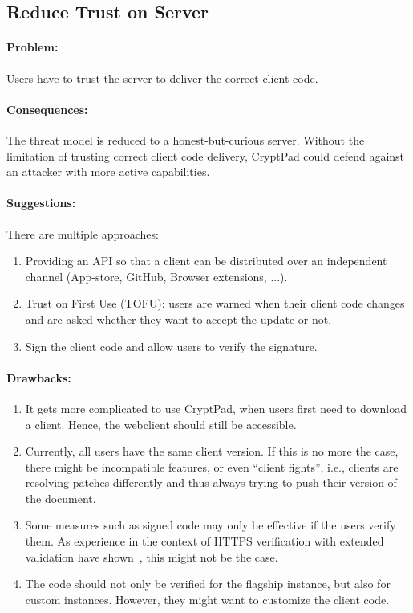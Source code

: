 \subsection{Reduce Trust on Server}

\paragraph{Problem:}
Users have to trust the server to deliver the correct client code.

\paragraph{Consequences:}
The threat model is reduced to a honest-but-curious server.
Without the limitation of trusting correct client code delivery, CryptPad could defend against an attacker with more active capabilities.

\paragraph{Suggestions:}
There are multiple approaches:
\begin{enumerate}
  \item Providing an API so that a client can be distributed over an independent channel (App-store, GitHub, Browser extensions, ...).
  \item Trust on First Use (TOFU): users are warned when their client code changes and are asked whether they want to accept the update or not.
  \item Sign the client code and allow users to verify the signature.
\end{enumerate}

\paragraph{Drawbacks:}
\begin{enumerate}
  \item It gets more complicated to use CryptPad, when users first need to download a client. Hence, the webclient should still be accessible.
  \item Currently, all users have the same client version. If this is no more the case, there might be incompatible features, or even \enquote{client fights}, i.e., clients are resolving patches differently and thus always trying to push their version of the document.
  \item Some measures such as signed code may only be effective if the users verify them. As experience in the context of HTTPS verification with extended validation have shown~\cite{Keizer2019}, this might not be the case.
  \item The code should not only be verified for the flagship instance, but also for custom instances. However, they might want to customize the client code.
\end{enumerate}
